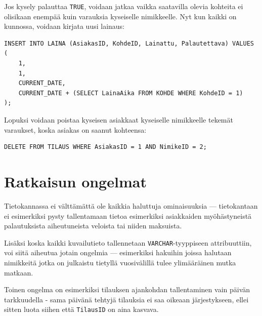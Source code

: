 \documentclass{article}
\let\stdsection\section
\renewcommand\section{\newpage\stdsection}
\begin{document}
Jos kysely palauttaa \texttt{TRUE}, voidaan jatkaa vaikka saatavilla olevia kohteita ei olisikaan enempää kuin varauksia kyseiselle nimikkeelle. Nyt kun kaikki on kunnossa, voidaan kirjata uusi lainaus:

\begin{lstlisting}
INSERT INTO LAINA (AsiakasID, KohdeID, Lainattu, Palautettava) VALUES (
    1,
    1,
    CURRENT_DATE,
    CURRENT_DATE + (SELECT LainaAika FROM KOHDE WHERE KohdeID = 1)
);
\end{lstlisting}

Lopuksi voidaan poistaa kyseisen asiakkaat kyseiselle nimikkeelle tekemät varaukset, koska asiakas on saanut kohteensa:

\begin{lstlisting}
DELETE FROM TILAUS WHERE AsiakasID = 1 AND NimikeID = 2;
\end{lstlisting}

\section{Ratkaisun ongelmat}
Tietokannassa ei välttämättä ole kaikkia haluttuja ominaisuuksia --- tietokantaan ei esimerkiksi pysty tallentamaan tietoa esimerkiksi asiakkaiden myöhästyneistä palautuksista aiheutuneista veloista tai niiden maksuista.

Lisäksi koska kaikki kuvailutieto tallennetaan \verb+VARCHAR+-tyyppiseen attribuuttiin, voi siitä aiheutua jotain ongelmia --- esimerkiksi hakuihin joissa halutaan nimikkeitä jotka on julkaistu tietyllä vuosivälillä tulee ylimääräinen mutka matkaan.

Toinen ongelma on esimerkiksi tilauksen ajankohdan tallentaminen vain päivän tarkkuudella - sama päivänä tehtyjä tilauksia ei saa oikeaan järjestykseen, ellei sitten luota siihen että \verb+TilausID+ on aina kasvava.
\end{document}
